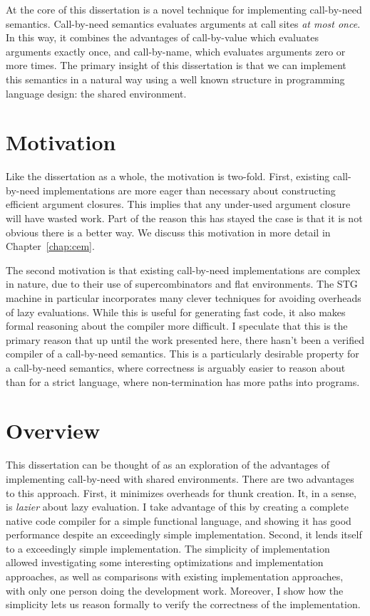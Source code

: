 At the core of this dissertation is a novel technique for implementing call-by-need
semantics. Call-by-need semantics evaluates arguments at call sites \emph{at most
once}. In this way, it combines the advantages of call-by-value which evaluates
arguments exactly once, and call-by-name, which evaluates arguments zero or more
times. The primary insight of this dissertation is that we can implement this
semantics in a natural way using a well known structure in programming language
design: the shared environment. 

\section{Motivation}

Like the dissertation as a whole, the motivation is two-fold. First, existing
call-by-need implementations are more eager than necessary about constructing
efficient argument closures. This implies that any under-used argument closure
will have wasted work. Part of the reason this has stayed the case is that it is
not obvious there is a better way. We discuss this motivation in more detail in
Chapter~\ref{chap:cem}. 

The second motivation is that existing call-by-need implementations are complex
in nature, due to their use of supercombinators and flat environments. The STG
machine in particular incorporates many clever techniques for avoiding overheads
of lazy evaluations. While this is useful for generating fast code, it also
makes formal reasoning about the compiler more difficult. I speculate that this
is the primary reason that up until the work presented here, there hasn't been a
verified compiler of a call-by-need semantics. This is a particularly desirable
property for a call-by-need semantics, where correctness is arguably easier to
reason about than for a strict language, where non-termination has more paths
into programs. 

\section{Overview}

This dissertation can be thought of as an exploration of the advantages of
implementing call-by-need with shared environments. There are two advantages to
this approach. First, it minimizes overheads for thunk creation. It, in a sense,
is \emph{lazier} about lazy evaluation. I take advantage of this by creating a
complete native code compiler for a simple functional language, and showing it
has good performance despite an exceedingly simple implementation. Second, it
lends itself to a exceedingly simple implementation. The simplicity of
implementation allowed investigating some interesting optimizations and
implementation approaches, as well as comparisons with existing implementation
approaches, with only one person doing the development work. Moreover, I show
how the simplicity lets us reason formally to verify the correctness of the
implementation.

